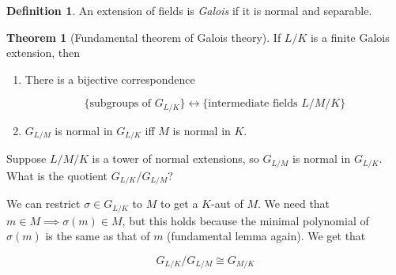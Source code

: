 \documentclass{article}
\theoremstyle{definition}
\newtheorem*{thm}{Theorem}
\newtheorem*{defn}{Definition}
\begin{document}
\begin{defn}
 An extension of fields is \textit{Galois} if it is normal and separable.
\end{defn}

\begin{thm}[Fundamental theorem of Galois theory]
  If $L/K$ is a finite Galois extension, then
  \begin{enumerate}
  \item There is a bijective correspondence

    $$\{\text{subgroups of } G_{L/K}\} \longleftrightarrow \{\text{intermediate fields } L/M/K\}$$
  \item $G_{L/M}$ is normal in $G_{L/K}$ iff $M$ is normal in $K$.
  \end{enumerate}
\end{thm}


Suppose $L/M/K$ is a tower of normal extensions, so $G_{L/M}$ is normal in
$G_{L/K}$. What is the quotient $G_{L/K}/G_{L/M}$?

We can restrict $\sigma\in G_{L/K}$ to $M$ to get a $K$-aut of $M$. We need that
$m\in M \implies \sigma(m)\in M$, but this holds because the minimal polynomial
of $\sigma(m)$ is the same as that of $m$ (fundamental lemma again). We get that

$$G_{L/K}/G_{L/M} \cong G_{M/K}$$
\end{document}
